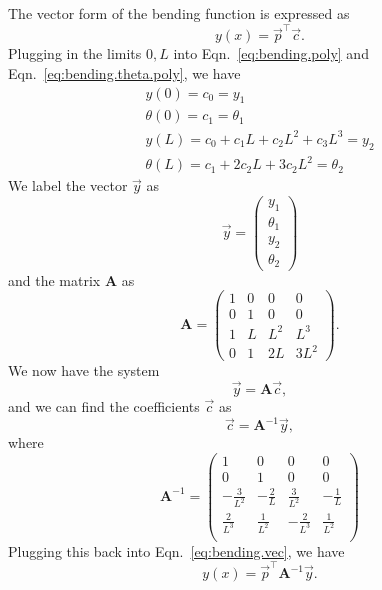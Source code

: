 The vector form of the bending function is expressed as
\begin{equation}
y(x) = \vec{p}^\top\vec{c}.
\label{eq:bending.vec}
\end{equation}
Plugging in the limits $0,L$ into Eqn.~\ref{eq:bending.poly} and Eqn.~\ref{eq:bending.theta.poly}, we have
\begin{eqnarray}
y(0) = c_0 = y_1\\
\theta(0) = c_1 = \theta_1 \\
y(L) = c_0+c_1L+c_2L^2+c_3L^3 = y_2 \\
\theta(L) = c_1+2c_2L+3c_2L^2 = \theta_2
\end{eqnarray}
We label the vector $\vec{y}$ as
\begin{equation}
\vec{y} = 
\begin{pmatrix}
y_1 \\
\theta_1 \\
y_2 \\
\theta_2
\end{pmatrix}
\label{eq:bending.vector.y}
\end{equation}
and the matrix $\mathbf A$ as
\begin{equation}
\mathbf{A} = 
\begin{pmatrix}
1 & 0 & 0 & 0 \\
0 & 1 & 0 & 0 \\
1 & L & L^2 & L^3 \\
0 & 1 & 2L & 3L^2
\end{pmatrix}.
\end{equation}
We now have the system
\begin{equation}
\vec{y} = \mathbf{A}\vec{c},
\end{equation}
and we can find the coefficients $\vec{c}$ as
\begin{equation}
\vec{c} = \mathbf{A}^{-1}\vec{y},
\end{equation}
where
\begin{equation}
\mathbf{A}^{-1} = 
\begin{pmatrix}
1 & 0 & 0 & 0 \\
0 & 1 & 0 & 0 \\
-\frac{3}{L^2} & -\frac{2}{L} & \frac{3}{L^2} & -\frac{1}{L} \\
\frac{2}{L^3} & \frac{1}{L^2} & -\frac{2}{L^3} & \frac{1}{L^2} \\
\end{pmatrix}
\end{equation}
Plugging this back into Eqn.~\ref{eq:bending.vec}, we have
\begin{equation}
y(x) = \vec{p}^\top\mathbf{A}^{-1}\vec{y}.
\end{equation}

